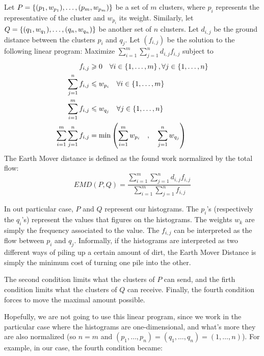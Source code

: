 \begin{definition}
	Let $P = \left\{ (p_1,w_{p_1}), \dots, (p_m,w_{p_m}) \right\}$ be a set of $m$ clusters, where $p_i$ represents the representative of the cluster and $w_{p_i}$ its weight. Similarly, let $Q = \left\{ (q_1,w_{q_1}), \dots, (q_n,w_{q_n}) \right\}$ be another set of $n$ clusters. Let $d_{i,j}$ be the ground distance between the clusters $p_i$ and $q_j$.
	Let $(f_{i,j})$ be the solution to the following linear program:
	Maximize $\sum_{i=1}^m \sum_{j=1}^n d_{i,j} f_{i,j}$ subject to
\[
    \begin{aligned}
        f_{i,j} &\geqslant 0  \quad \forall i \in \left\{ 1, \dots, m \right\}, \forall j \in \left\{ 1, \dots, n \right\} \\
        \sum_{j=1}^{n}{f_{i,j}} &\leqslant w_{p_i} \quad \forall i \in \left\{ 1, \dots, m \right\}\\
        \sum_{i=1}^{m}{f_{i,j}} &\leqslant w_{q_j} \quad \forall j \in \left\{ 1, \dots, n \right\} \\
        \sum_{i=1}^m \sum_{j=1}^n f_{i,j} &= \operatorname{min} \left( \sum_{i=1}^m w_{p_i} \quad,\quad \sum_{j=1}^n w_{q_j}\right)
    \end{aligned}
\]
The Earth Mover distance is defined as the found work normalized by the total flow:
\[
	EMD(P,Q) = \frac{\sum_{i=1}^m \sum_{j=1}^n d_{i,j} f_{i,j}}{\sum_{i=1}^m \sum_{j=1}^n f_{i,j}}
\]
\end{definition}

In out particular case, $P$ and $Q$ represent our histograms. The $p_i$'s (respectively the $q_i$'s) represent the values that figures on the histograms. The weights $w_k$ are simply the frequency associated to the value. The $f_{i,j}$ can be interpreted as the flow between $p_i$ and $q_j$. Informally, if the histograms are interpreted as two different ways of piling up a certain amount of dirt, the Earth Mover Distance is simply the minimum cost of turning one pile into the other.

The second condition limits what the clusters of $P$ can send, and the firth condition limits what the clusters of $Q$ can receive. Finally, the fourth condition forces to move the maximal amount possible.

Hopefully, we are not going to use this linear program, since we work in the particular case where the histograms are one-dimensional, and what's more they are also normalized (so $n = m$ and $(p_1,\dots,p_n) = (q_1,\dots,q_n) = (1,\dots,n)$). For example, in our case, the fourth condition became:

